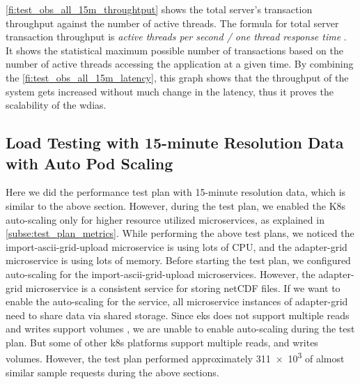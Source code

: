 \cref{fi:test_obs_all_15m_throughtput} shows the total server's transaction throughput against the number of active threads.
The formula for total server transaction throughput is \emph{active threads per second / one thread response time} \cite{ApacheSoftwareFoundationJMeter:Plugin}.
It shows the statistical maximum possible number of transactions based on the number of active threads accessing the application at a given time. 
By combining the \cref{fi:test_obs_all_15m_latency}, this graph shows that the throughput of the system gets increased without much change in the latency, thus it proves the scalability of the \acrshort{wdias}.


\subsection{Load Testing with 15-minute Resolution Data with Auto Pod Scaling}
\label{subse:obs_test_plan_all_auto_15min}

Here we did the performance test plan with 15-minute resolution data, which is similar to the above section. However, during the test plan, we enabled the K8s auto-scaling only for higher resource utilized microservices, as explained in \cref{subse:test_plan_metrics}. While performing the above test plans, we noticed the import-ascii-grid-upload microservice is using lots of CPU, and the adapter-grid microservice is using lots of memory. Before starting the test plan, we configured auto-scaling for the import-ascii-grid-upload microservices. However, the adapter-grid microservice is a consistent service for storing netCDF files. If we want to enable the auto-scaling for the service, all microservice instances of adapter-grid need to share data via shared storage. Since \acrshort{eks} does not support multiple reads and writes support volumes \cite{LinuxFoundationKubernetesVolumes}, we are unable to enable auto-scaling during the test plan. But some of other \acrshort{k8s} platforms support multiple reads, and writes volumes. However, the test plan performed approximately \num{311e3} of almost similar sample requests during the above sections.

